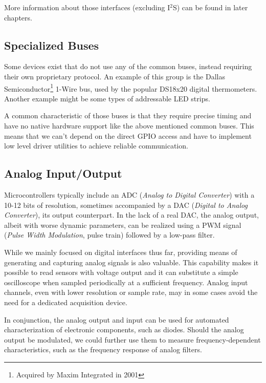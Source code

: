 More information about those interfaces (excluding I$^2$S) can be found in later chapters. 

\subsection{Specialized Buses}

Some devices exist that do not use any of the common buses, instead requiring their own proprietary protocol. An example of this group is the Dallas Semiconductor\footnote{Acquired by Maxim Integrated in 2001} 1-Wire bus, used by the popular DS18x20 digital thermometers. Another example might be some types of addressable LED strips.

A common characteristic of those buses is that they require precise timing and have no native hardware support like the above mentioned common buses. This means that we can't depend on the direct GPIO access and have to implement low level driver utilities to achieve reliable communication.

\subsection{Analog Input/Output}

Microcontrollers typically include an ADC (\textit{Analog to Digital Converter}) with a 10-12 bits of resolution, sometimes accompanied by a DAC (\textit{Digital to Analog Converter}), its output counterpart. In the lack of a real DAC, the analog output, albeit with worse dynamic parameters, can be realized using a PWM signal (\textit{Pulse Width Modulation}, pulse train) followed by a low-pass filter.

While we mainly focused on digital interfaces thus far, providing means of generating and capturing analog signals is also valuable. This capability makes it possible to read sensors with voltage output and it can substitute a simple oscilloscope when sampled periodically at a sufficient frequency. Analog input channels, even with lower resolution or sample rate, may in some cases avoid the need for a dedicated acquisition device.

In conjunction, the analog output and input can be used for automated characterization of electronic components, such as diodes. Should the analog output be modulated, we could further use them to measure frequency-dependent characteristics, such as the frequency response of analog filters.




